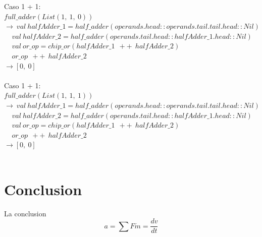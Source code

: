 \documentclass[12pt, a4paper]{article}
\begin{document}
Caso 1 + 1:\\
$full\_adder(List(1,~1,~0))$\\
$\rightarrow~val~halfAdder\_1 = half\_adder(operands.head::operands.tail.tail.head::Nil)$ \\
$~~~~~val~halfAdder\_2 = half\_adder(operands.tail.head::halfAdder\_1.head::Nil)$ \\
$~~~~~val~or\_op = chip\_or(halfAdder\_1~~++~~halfAdder\_2)$ \\
$~~~~~or\_op~~++~~halfAdder\_2$ \\
$\rightarrow [0,~0]$\\ \\

Caso 1 + 1:\\
$full\_adder(List(1,~1,~1))$\\
$\rightarrow~val~halfAdder\_1 = half\_adder(operands.head::operands.tail.tail.head::Nil)$ \\
$~~~~~val~halfAdder\_2 = half\_adder(operands.tail.head::halfAdder\_1.head::Nil)$ \\
$~~~~~val~or\_op = chip\_or(halfAdder\_1~~++~~halfAdder\_2)$ \\
$~~~~~or\_op~~++~~halfAdder\_2$ \\
$\rightarrow [0,~0]$\\ \\

\section{Conclusion}
La conclusion
\newpage{}
\begin{displaymath}
 a = \sum F \dot m = \frac{dv}{dt}
\end{displaymath}
\end{document}

